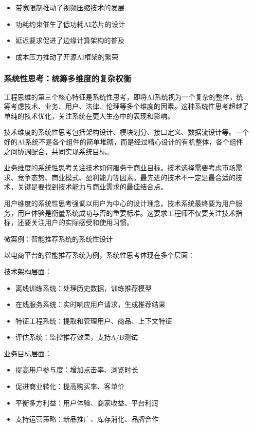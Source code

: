 \begin{itemize}
\item 带宽限制推动了视频压缩技术的发展
\item 功耗约束催生了低功耗AI芯片的设计
\item 延迟要求促进了边缘计算架构的普及
\item 成本压力推动了开源AI框架的繁荣
\end{itemize}

\subsubsection{系统性思考：统筹多维度的复杂权衡}

工程思维的第三个核心特征是系统性思考，即将AI系统视为一个复杂的整体，统筹考虑技术、业务、用户、法律、伦理等多个维度的因素。这种系统性思考超越了单纯的技术优化，关注系统在更大生态中的表现和影响。

技术维度的系统性思考包括架构设计、模块划分、接口定义、数据流设计等。一个好的AI系统不是各个组件的简单堆砌，而是经过精心设计的有机整体，各个组件之间协调配合，共同实现系统目标。

业务维度的系统性思考关注技术如何服务于商业目标。技术选择需要考虑市场需求、竞争态势、商业模式、盈利能力等因素。最先进的技术不一定是最合适的技术，关键是要找到技术能力与商业需求的最佳结合点。

用户维度的系统性思考强调以用户为中心的设计理念。技术系统最终要为用户服务，用户体验是衡量系统成功与否的重要标准。这要求工程师不仅要关注技术指标，还要关注用户的实际感受和使用习惯。

微案例：智能推荐系统的系统性设计

以电商平台的智能推荐系统为例，系统性思考体现在多个层面：

技术架构层面：
\begin{itemize}
\item 离线训练系统：处理历史数据，训练推荐模型
\item 在线服务系统：实时响应用户请求，生成推荐结果
\item 特征工程系统：提取和管理用户、商品、上下文特征
\item 评估系统：监控推荐效果，支持A/B测试
\end{itemize}

业务目标层面：
\begin{itemize}
\item 提高用户参与度：增加点击率、浏览时长
\item 促进商业转化：提高购买率、客单价
\item 平衡多方利益：用户体验、商家收益、平台利润
\item 支持运营策略：新品推广、库存消化、品牌合作
\end{itemize}


